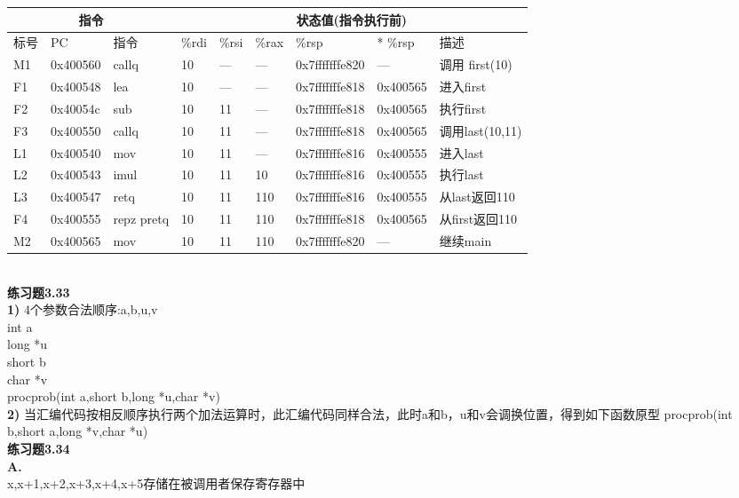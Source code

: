 \documentclass{article}
\begin{document}
\begin{CJK}{UTF8}{uyhei}
\begin{table}[htbp]
\begin{tabular}{|m{3em}<{\centering}|m{8em}<{\centering}|m{3em}<{\centering}|m{4em}<{\centering}|m{4em}<{\centering}|m{4em}<{\centering}|m{8em}<{\centering}|m{4em}<{\centering}|m{8em}<{\centering}|}
\hline
\multicolumn{3}{|c}{指令}	&	\multicolumn{6}{|c|}{状态值(指令执行前)}	\\
\hline
标号	&	PC	&	指令	&	\%rdi	&	\%rsi	&	\%rax	&	\%rsp	&	* \%rsp	&	描述	\\
\hline
M1	&	0x400560	&	callq	&	10	&	---	&	---	&	0x7fffffffe820	&	---	&	调用 first(10)	\\
\hline
F1	&	0x400548	&	lea	&	10	&	---	&	---	&	0x7fffffffe818	&	0x400565	&	进入first	\\
\hline
F2	&	0x40054c	&	sub	&	10	&	11	&	---	&	0x7fffffffe818	&	0x400565	&	执行first	\\
\hline
F3	&	0x400550	&	callq	&	10	&	11	&	---	&	0x7fffffffe818	&	0x400565	&	调用last(10,11)	\\
\hline
L1	&	0x400540	&	mov	&	10	&	11	&	---	&	0x7fffffffe816	&	0x400555	&	进入last	\\
\hline
L2	&	0x400543	&	imul	&	10	&	11	&	10	&	0x7fffffffe816	&	0x400555	&	执行last	\\
\hline
L3	&	0x400547	&	retq	&	10	&	11	&	110	&	0x7fffffffe816	&	0x400555	&	从last返回110	\\
\hline
F4	&	0x400555	&	repz pretq	&	10	&	11	&	110	&	0x7fffffffe818	&	0x400565	&	从first返回110	\\
\hline
M2	&	0x400565	&	mov	&	10	&	11	&	110	&	0x7fffffffe820	&	---	&	继续main	\\
\hline
\end{tabular}
\end{table}	\\[2ex]
\textbf{练习题3.33}	\\
\textbf{1)} 4个参数合法顺序:a,b,u,v	\\
int a	\\
long *u	\\
short b	\\
char *v	\\
procprob(int a,short b,long *u,char *v)	\\
\textbf{2)} 当汇编代码按相反顺序执行两个加法运算时，此汇编代码同样合法，此时a和b，u和v会调换位置，得到如下函数原型
procprob(int b,short a,long *v,char *u)	\\[3ex]
\textbf{练习题3.34}	\\
\textbf{A.}	\\
x,x+1,x+2,x+3,x+4,x+5存储在被调用者保存寄存器中	\\

\end{CJK}
\end{document}
